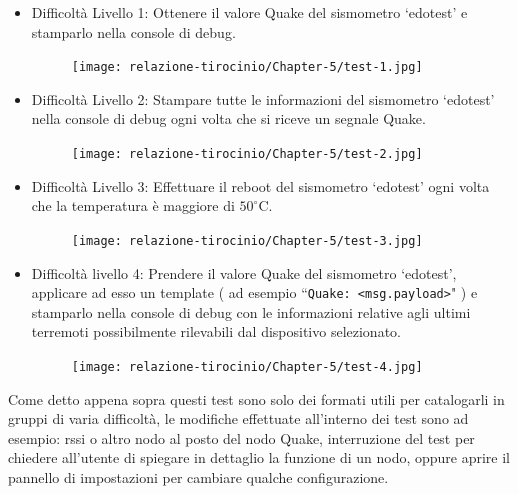 \documentclass[a4paper,10pt]{memoir}
\begin{document}
\begin{itemize}
    \item Difficoltà Livello 1: Ottenere il valore Quake del sismometro ‘edotest’ e stamparlo nella console di debug.
    
    \begin{figure}[ht]
        \centering
        \texttt{[image: relazione-tirocinio/Chapter-5/test-1.jpg]}
        \label{fig:test1}
    \end{figure}
    
    \item Difficoltà Livello 2: Stampare tutte le informazioni del sismometro ‘edotest’ nella console di debug ogni volta che si riceve un segnale Quake.
    \clearpage
    \begin{figure}[hbt]
        \centering
        \texttt{[image: relazione-tirocinio/Chapter-5/test-2.jpg]}
        \label{fig:test1}
    \end{figure}
    \item Difficoltà Livello 3: Effettuare il reboot del sismometro ‘edotest’ ogni volta che la temperatura è maggiore di $50^{\circ}$C.
    \begin{figure}[hbt]
        \centering
        \texttt{[image: relazione-tirocinio/Chapter-5/test-3.jpg]}
        \label{fig:test1}
    \end{figure}
    
    \item Difficoltà livello 4: Prendere il valore Quake del sismometro ‘edotest’, applicare ad esso un template ( ad esempio ``\texttt{Quake: <msg.payload>}" ) e stamparlo nella console di debug con le informazioni relative agli ultimi terremoti possibilmente rilevabili dal dispositivo selezionato.
    
    \begin{figure}[ht]
        \centering
        \texttt{[image: relazione-tirocinio/Chapter-5/test-4.jpg]}
        \label{fig:test1}
    \end{figure}
    
\end{itemize}

Come detto appena sopra questi test sono solo dei formati utili per catalogarli in gruppi di varia difficoltà, le modifiche effettuate all'interno dei test sono ad esempio: rssi o altro nodo al posto del nodo Quake, interruzione del test per chiedere all'utente di spiegare in dettaglio la funzione di un nodo, oppure aprire il pannello di impostazioni per cambiare qualche configurazione. 
\end{document}

